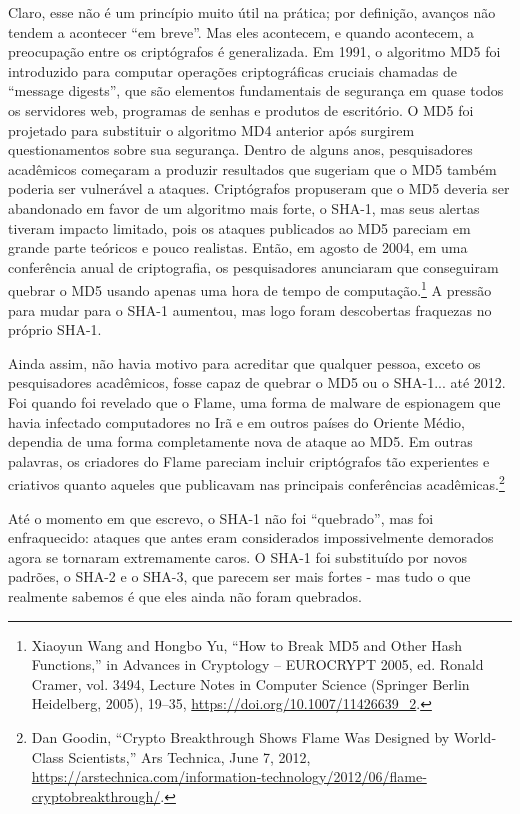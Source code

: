 \documentclass{book}
\begin{document}
Claro, esse não é um princípio muito útil na prática; por definição, avanços não tendem a acontecer ``em breve''. Mas eles acontecem, e quando acontecem, a preocupação entre os criptógrafos é generalizada. Em 1991, o algoritmo MD5 foi introduzido para computar operações criptográficas cruciais chamadas de ``message digests'', que são elementos fundamentais de segurança em quase todos os servidores web, programas de senhas e produtos de escritório. O MD5 foi projetado para substituir o algoritmo MD4 anterior após surgirem questionamentos sobre sua segurança. Dentro de alguns anos, pesquisadores acadêmicos começaram a produzir resultados que sugeriam que o MD5 também poderia ser vulnerável a ataques. Criptógrafos propuseram que o MD5 deveria ser abandonado em favor de um algoritmo mais forte, o SHA-1, mas seus alertas tiveram impacto limitado, pois os ataques publicados ao MD5 pareciam em grande parte teóricos e pouco realistas. Então, em agosto de 2004, em uma conferência anual de criptografia, os pesquisadores anunciaram que conseguiram quebrar o MD5 usando apenas uma hora de tempo de computação.\footnote{Xiaoyun Wang and Hongbo Yu, “How to Break MD5 and Other Hash Functions,” in Advances in Cryptology – EUROCRYPT 2005, ed. Ronald Cramer, vol. 3494, Lecture Notes in Computer Science (Springer Berlin Heidelberg, 2005), 19–35, \url{https://doi.org/10.1007/11426639_2}.} A pressão para mudar para o SHA-1 aumentou, mas logo foram descobertas fraquezas no próprio SHA-1.

Ainda assim, não havia motivo para acreditar que qualquer pessoa, exceto os pesquisadores acadêmicos, fosse capaz de quebrar o MD5 ou o SHA-1... até 2012. Foi quando foi revelado que o Flame, uma forma de malware de espionagem que havia infectado computadores no Irã e em outros países do Oriente Médio, dependia de uma forma completamente nova de ataque ao MD5. Em outras palavras, os criadores do Flame pareciam incluir criptógrafos tão experientes e criativos quanto aqueles que publicavam nas principais conferências acadêmicas.\footnote{Dan Goodin, “Crypto Breakthrough Shows Flame Was Designed by World‐Class Scientists,” Ars Technica, June 7, 2012, \url{https://arstechnica.com/information‐technology/2012/06/flame‐cryptobreakthrough/}.}

Até o momento em que escrevo, o SHA-1 não foi ``quebrado'', mas foi enfraquecido: ataques que antes eram considerados impossivelmente demorados agora se tornaram extremamente caros. O SHA-1 foi substituído por novos padrões, o SHA-2 e o SHA-3, que parecem ser mais fortes - mas tudo o que realmente sabemos é que eles ainda não foram quebrados.
\end{document}
